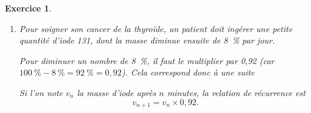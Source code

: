 \documentclass[10pt]{article}
\newtheorem{exo}{Exercice}
\begin{document}
\begin{exo}
\begin{enumerate}
\medskip

Quand on avance de 1 en abscisse, on monte de 2 en ordonnée, donc cela correspond à une suite 

\medskip

Si l'on note $u$ la suite des termes, la relation de récurrence est \[u_{n+1}=u_n+2.\]
\item Pour soigner son cancer de la thyroïde, un patient doit ingérer une petite quantité d'iode 131, dont la masse diminue ensuite de 8~\% par jour.

\medskip

Pour diminuer un nombre de 8~\%, il faut le multiplier par 0,92 (car $100~\%-8~\%=92~\%=0,92$). Cela correspond donc à une suite 

\medskip

Si l'on note $v_n$ la masse d'iode après $n$ minutes, la relation de récurrence est \[v_{n+1}=v_n\times 0,92.\]
\end{enumerate}
\end{exo}
\end{document}

